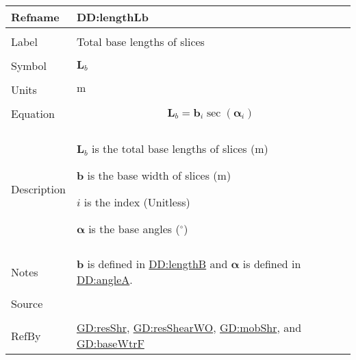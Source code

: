 \documentclass[12pt]{article}
\begin{document}
\vspace{\baselineskip}
\noindent
\begin{minipage}{\textwidth}
\begin{tabular}{>{\raggedright}p{}>{\raggedright\arraybackslash}p{}}
\toprule \textbf{Refname} & \textbf{DD:lengthLb}
\label{DD:lengthLb}
\\ \midrule \\
Label & Total base lengths of slices
        
\\ \midrule \\
Symbol & ${\symbf{L}_{b}}$
         
\\ \midrule \\
Units & ${\text{m}}$
        
\\ \midrule \\
Equation & \begin{displaymath}
           {\symbf{L}_{b}}={\symbf{b}}_{i} \sec\left({\symbf{α}}_{i}\right)
           \end{displaymath}
\\ \midrule \\
Description & \begin{symbDescription}
              \item{${\symbf{L}_{b}}$ is the total base lengths of slices (${\text{m}}$)}
              \item{$\symbf{b}$ is the base width of slices (${\text{m}}$)}
              \item{$i$ is the index (Unitless)}
              \item{$\symbf{α}$ is the base angles (${{}^{\circ}}$)}
              \end{symbDescription}
\\ \midrule \\
Notes & $\symbf{b}$ is defined in \hyperref[DD:lengthB]{DD:lengthB} and $\symbf{α}$ is defined in \hyperref[DD:angleA]{DD:angleA}.
        
\\ \midrule \\
Source & \cite{fredlund1977}
         
\\ \midrule \\
RefBy & \hyperref[GD:resShr]{GD:resShr}, \hyperref[GD:resShearWO]{GD:resShearWO}, \hyperref[GD:mobShr]{GD:mobShr}, and \hyperref[GD:baseWtrF]{GD:baseWtrF}
        
\\ \bottomrule
\end{tabular}
\end{minipage}
\end{document}
